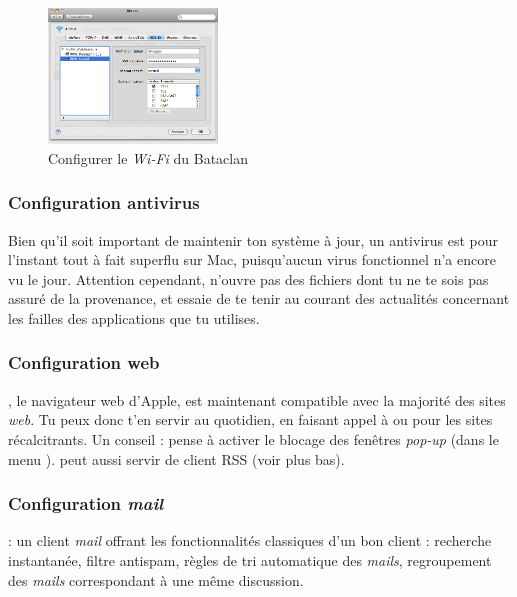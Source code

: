 \begin{figure}[p]
    \begin{center}
      \includegraphics[width=0.4\textwidth]{images/mac_config_wifi.png} 
      \caption{Configurer le \emph{Wi-Fi} du Bataclan}
    \end{center}
  \end{figure}


\subsubsection{Configuration antivirus}

Bien qu'il soit important de maintenir ton système à jour, un antivirus est pour l'instant tout à fait superflu sur Mac, puisqu'aucun virus fonctionnel n'a encore vu le jour. Attention cependant, n'ouvre pas des fichiers dont tu ne te sois pas assuré de la provenance, et essaie de te tenir au courant des actualités concernant les failles des applications que tu utilises.



\subsubsection{Configuration web}

, le navigateur web d'Apple, est maintenant compatible avec la majorité des sites \emph{web}. Tu peux donc t'en servir au quotidien, en faisant appel à  ou  pour les sites récalcitrants. Un conseil : pense à activer le blocage des fenêtres \emph{pop-up} (dans le menu ).  peut aussi servir de client RSS (voir plus bas).\\


\subsubsection{Configuration \emph{mail}}
  : un client \emph{mail} offrant les fonctionnalités classiques d'un bon client : recherche instantanée, filtre antispam, règles de tri automatique des \emph{mails}, regroupement des \emph{mails} correspondant à une même discussion.

